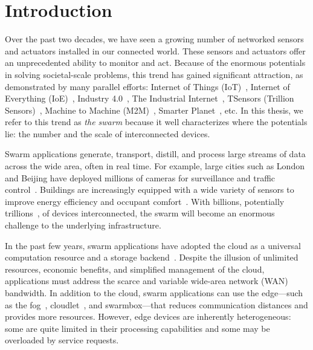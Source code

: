 \documentclass[thesis.tex]{subfiles}
\begin{document}
\chapter{Introduction}

Over the past two decades, we have seen a growing number of networked sensors
and actuators installed in our connected world. These sensors and actuators
offer an unprecedented ability to monitor and act. Because of the enormous
potentials in solving societal-scale problems, this trend has gained significant
attraction, as demonstrated by many parallel efforts: Internet of Things
(IoT)~\cite{atzori2010internet}, Internet of Everything
(IoE)~\cite{bradley2013internet}, Industry 4.0~\cite{lasi2014industry}, The
Industrial Internet~\cite{eigner2018industrial}, TSensors (Trillion
Sensors)~\cite{bogue2014towards}, Machine to Machine
(M2M)~\cite{anton2014machine}, Smarter Planet~\cite{palmisano2008smarter},
etc. In this thesis, we refer to this trend as \textit{the swarm} because it
well characterizes where the potentials lie: the number and the scale of
interconnected devices.

Swarm applications generate, transport, distill, and process large streams of
data across the wide area, often in real time. For example, large cities such as
London and Beijing have deployed millions of cameras for surveillance and
traffic control~\cite{skynet, london.surveillance}. Buildings are increasingly
equipped with a wide variety of sensors to improve energy efficiency and
occupant comfort~\cite{dawson2010smap, krioukov2012building}. With billions,
potentially trillions~\cite{middleton2013forecast}, of devices interconnected,
the swarm will become an enormous challenge to the underlying infrastructure.

In the past few years, swarm applications have adopted the cloud as a universal
computation resource and a storage backend~\cite{carriots, grovestreams, sami,
  xively, gupta2014bolt, zachariah1001internet}. Despite the illusion of
unlimited resources, economic benefits, and simplified management of the cloud,
applications must address the scarce and variable wide-area network (WAN)
bandwidth. In addition to the cloud, swarm applications can use the edge---such
as the fog~\cite{bonomi2012fog, bar2013fog}, cloudlet~\cite{ha2014towards,
  satyanarayanan2009case, chen2018application}, and swarmbox---that reduces
communication distances and provides more resources. However, edge devices are
inherently heterogeneous: some are quite limited in their processing
capabilities and some may be overloaded by service requests.
\end{document}
